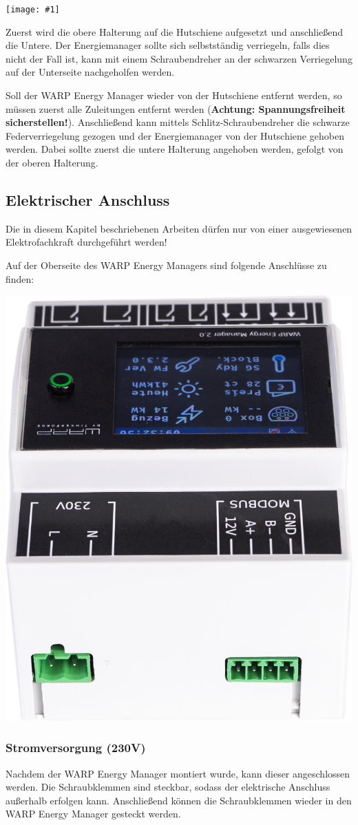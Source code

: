 \documentclass[a4paper,10pt]{article}
\newcommand{\hint}[1]{\begin{tcolorbox}[colback=boxgray,colframe=black,coltext=
white,title=Hinweis,left*=2mm,right*=2mm,boxsep=1mm,bottom=1mm,top=1mm]#1\end{tcolorbox}}
\newcommand{\gfx}[1]{\texttt{[image: \#1]}}
\begin{document}
\begin{multicols*}{2}
	\gfx{./img_v2/wem2_mounting.jpg}

	Zuerst wird die obere Halterung auf die Hutschiene aufgesetzt und anschließend
	die Untere. Der Energiemanager sollte sich selbstständig verriegeln, falls dies
	nicht der Fall ist, kann mit einem Schraubendreher an der schwarzen Verriegelung
	auf der Unterseite nachgeholfen werden.

	Soll der WARP Energy Manager wieder von der Hutschiene entfernt werden, so
	müssen zuerst alle Zuleitungen entfernt werden (\textbf{Achtung: Spannungsfreiheit
	sicherstellen!}). Anschließend kann mittels Schlitz-Schraubendreher die schwarze
	Federverriegelung gezogen und der Energiemanager von der Hutschiene
	gehoben werden. Dabei sollte zuerst die untere Halterung angehoben werden,
	gefolgt von der oberen Halterung.

    \newpage

	\subsection{Elektrischer Anschluss}
	\hint{Die in diesem Kapitel beschriebenen Arbeiten dürfen nur von einer ausgewiesenen
		Elektrofachkraft durchgeführt werden!}
    
    Auf der Oberseite des WARP Energy Managers sind folgende Anschlüsse zu finden:
	\begin{center}
        \includegraphics[width=0.5\linewidth]{./img_v2/wem2-connections-top.png}
    \end{center}

	\subsubsection{Stromversorgung (230V)}
	Nachdem der WARP Energy Manager montiert wurde, kann dieser angeschlossen werden.
	Die Schraubklemmen sind steckbar, sodass der elektrische Anschluss
	außerhalb erfolgen kann. Anschließend können die Schraubklemmen wieder in
	den WARP Energy Manager gesteckt werden.


\end{multicols*}
\end{document}
